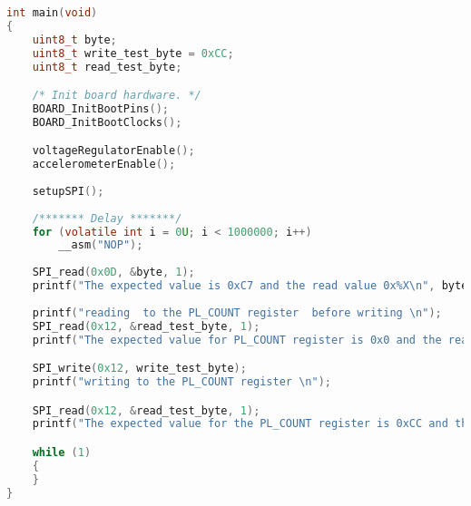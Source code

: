 \begin{lstlisting}[language=c,caption=Problem 4 main, label=list:p4_main]
int main(void)
{
    uint8_t byte;
    uint8_t write_test_byte = 0xCC;
    uint8_t read_test_byte;

    /* Init board hardware. */
    BOARD_InitBootPins();
    BOARD_InitBootClocks();

    voltageRegulatorEnable();
    accelerometerEnable();
    
    setupSPI();
    
    /******* Delay *******/
    for (volatile int i = 0U; i < 1000000; i++)
        __asm("NOP");
    
    SPI_read(0x0D, &byte, 1);
    printf("The expected value is 0xC7 and the read value 0x%X\n", byte);
    
    printf("reading  to the PL_COUNT register  before writing \n");
    SPI_read(0x12, &read_test_byte, 1);
    printf("The expected value for PL_COUNT register is 0x0 and the read value 0x%X\n", read_test_byte);

    SPI_write(0x12, write_test_byte);
    printf("writing to the PL_COUNT register \n");

    SPI_read(0x12, &read_test_byte, 1);
    printf("The expected value for the PL_COUNT register is 0xCC and the read value 0x%X\n", read_test_byte);

    while (1)
    {
    }
}
\end{lstlisting}